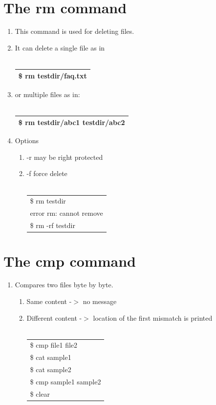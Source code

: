 \documentclass[12pt, a4paper]{report}
\begin{document}
\section{The rm command}
\begin{enumerate}
\item This command is used for deleting files.
\item It can delete a single file as in\\
\\
\begin{tabular}{|l|}\hline
\$ rm testdir/faq.txt\\ \hline
\end{tabular}
\item or multiple files as in:\\
\\
\begin{tabular}{|l|}\hline
\$ rm testdir/abc1 testdir/abc2 \\ \hline
\end{tabular}	
\item Options
\begin{enumerate}
\item -r may be right protected
\item -f force delete\\
\\
\begin{tabular}{|l|}\hline
\$ rm testdir\\
error rm: cannot remove\\
\$ rm -rf testdir\\ \hline
\end{tabular}
\end{enumerate}
\end{enumerate}
\section{The cmp command}
\begin{enumerate}
\item Compares two files byte by byte.
\begin{enumerate}
\item Same content -$>$ no message
\item Different content -$>$ location of the first mismatch is printed\\
\\
\begin{tabular}{|l|}\hline
\$ cmp file1 file2\\
\$ cat sample1\\
\$ cat sample2\\
\$ cmp sample1 sample2\\
\$ clear\\ \hline
\end{tabular}
\end{enumerate}
\end{enumerate}
\end{document}
